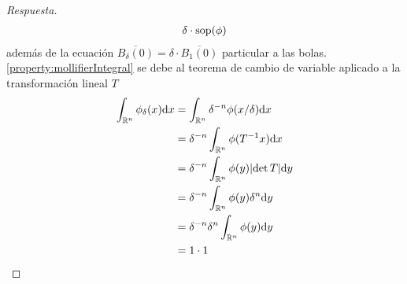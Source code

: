 \documentclass{article}
\newcommand{\realNumbers}{\mathbb{R}}
\DeclareMathOperator{\support}{\textnormal{sop}}
\theoremstyle{remark}
\begin{document}
\begin{proof}[Respuesta]
\begin{align}
      \delta \cdot 
      \support(\phi)
    \end{align}
    además de la ecuación \(\overline{B_{\delta}(0)} = \delta \cdot \overline{B_1(0)}\) particular a las bolas.
    \ref{property:mollifierIntegral}
    se debe al teorema de cambio de variable aplicado a la transformación lineal \(T\)
    \begin{align}
      \int_{\realNumbers^n} \phi_{\delta}(x) \dd x
      &=
      \int_{\realNumbers^n} \delta^{- n} \phi(x / \delta) \dd x
      \\
      &=
      \delta^{- n}
      \int_{\realNumbers^n}\phi(T^{- 1} x) \dd x
      \\
      &=
      \delta^{- n}
      \int_{\realNumbers^n}\phi(y) \abs{\det T} \dd y
      \\
      &=
      \delta^{- n}
      \int_{\realNumbers^n}\phi(y) \delta^n \dd y
      \\
      &=
      \delta^{- n} \delta^n 
      \int_{\realNumbers^n}\phi(y) \dd y
      \\
      &=
      1 
      \cdot 1
    \end{align}
  \end{proof}
\end{document}
